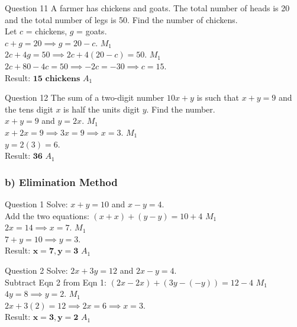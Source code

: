 \documentclass[12pt, a4paper, oneside]{article}
\begin{document}
\begin{solvingbox}{Question 11}
A farmer has chickens and goats. The total number of heads is 20 and the total number of legs is 50. Find the number of chickens. \\
Let $c$ = chickens, $g$ = goats. \\
$c + g = 20 \implies g = 20 - c$. \hfill $M_1$ \\
$2c + 4g = 50 \implies 2c + 4(20 - c) = 50$. \hfill $M_1$ \\
$2c + 80 - 4c = 50 \implies -2c = -30 \implies c = 15$. \\
Result: $\mathbf{15 \text{ chickens}}$ \hfill $A_1$
\end{solvingbox}

\begin{solvingbox}{Question 12}
The sum of a two-digit number $10x + y$ is such that $x + y = 9$ and the tens digit $x$ is half the units digit $y$. Find the number. \\
$x + y = 9$ and $y = 2x$. \hfill $M_1$ \\
$x + 2x = 9 \implies 3x = 9 \implies x = 3$. \hfill $M_1$ \\
$y = 2(3) = 6$. \\
Result: $\mathbf{36}$ \hfill $A_1$
\end{solvingbox}

\newpage
\subsubsection*{b) Elimination Method}

\begin{solvingbox}{Question 1}
Solve: $x + y = 10$ and $x - y = 4$. \\
Add the two equations: $(x+x) + (y-y) = 10+4$ \hfill $M_1$ \\
$2x = 14 \implies x = 7$. \hfill $M_1$ \\
$7 + y = 10 \implies y = 3$. \\
Result: $\mathbf{x=7, y=3}$ \hfill $A_1$
\end{solvingbox}

\begin{solvingbox}{Question 2}
Solve: $2x + 3y = 12$ and $2x - y = 4$. \\
Subtract Eqn 2 from Eqn 1: $(2x-2x) + (3y - (-y)) = 12-4$ \hfill $M_1$ \\
$4y = 8 \implies y = 2$. \hfill $M_1$ \\
$2x + 3(2) = 12 \implies 2x = 6 \implies x = 3$. \\
Result: $\mathbf{x=3, y=2}$ \hfill $A_1$
\end{solvingbox}
\end{document}
